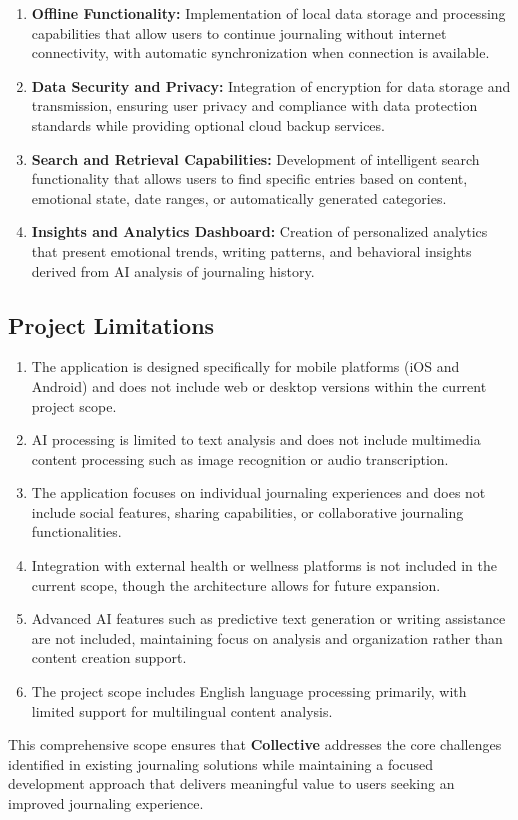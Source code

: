 \begin{enumerate}
	\item \textbf{Offline Functionality:} Implementation of local data storage and processing capabilities that allow users to continue journaling without internet connectivity, with automatic synchronization when connection is available.
	
	\item \textbf{Data Security and Privacy:} Integration of encryption for data storage and transmission, ensuring user privacy and compliance with data protection standards while providing optional cloud backup services.
	
	\item \textbf{Search and Retrieval Capabilities:} Development of intelligent search functionality that allows users to find specific entries based on content, emotional state, date ranges, or automatically generated categories.
	
	\item \textbf{Insights and Analytics Dashboard:} Creation of personalized analytics that present emotional trends, writing patterns, and behavioral insights derived from AI analysis of journaling history.
\end{enumerate}

\subsection{Project Limitations}\label{subsec:limitations}

\begin{enumerate}
	\item The application is designed specifically for mobile platforms (iOS and Android) and does not include web or desktop versions within the current project scope.
	
	\item AI processing is limited to text analysis and does not include multimedia content processing such as image recognition or audio transcription.
	
	\item The application focuses on individual journaling experiences and does not include social features, sharing capabilities, or collaborative journaling functionalities.
	
	\item Integration with external health or wellness platforms is not included in the current scope, though the architecture allows for future expansion.
	
	\item Advanced AI features such as predictive text generation or writing assistance are not included, maintaining focus on analysis and organization rather than content creation support.
	
	\item The project scope includes English language processing primarily, with limited support for multilingual content analysis.
\end{enumerate}

This comprehensive scope ensures that \textbf{Collective} addresses the core challenges identified in existing journaling solutions while maintaining a focused development approach that delivers meaningful value to users seeking an improved journaling experience.
